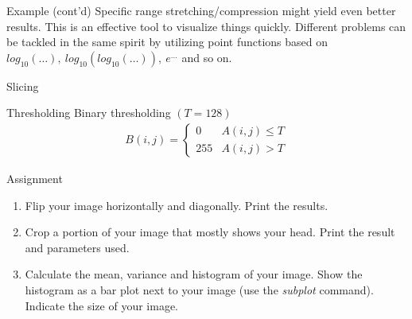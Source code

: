 %
%
\begin{slide}{Example (cont'd)}
\centering
\scriptsize
Specific range stretching/compression might yield even better
results.
This is an effective tool to visualize things quickly.
Different problems can be tackled in the same spirit
by utilizing point functions based on $log_{10}(\ldots),\
log_{10}(log_{10}(\ldots)),\ e^{\ldots}$ and so on.
\end{slide}


%
%
\begin{slide}{Slicing}
\vspace*{-12pt}
\end{slide}


%
%
\begin{slide}{Thresholding}
Binary thresholding $(T=128)$
\begin{eqnarray*}
B(i,j)=\left\{\begin{array}{ll}
0& A(i,j)\leq T \\
255& A(i,j)>T
\end{array}\right.
\end{eqnarray*}
\end{slide}


%
%
\begin{frame}{Assignment} %
\begin{enumerate}
\item Flip your image horizontally and diagonally.
Print the results.
\item Crop a portion of your image that mostly shows
your head.
Print the result and parameters used.
\item Calculate the mean, variance and histogram of your image.
Show the histogram as a bar plot next to your image
(use the {\em subplot} command).
Indicate the size of your image.

\end{enumerate}
\end{frame}